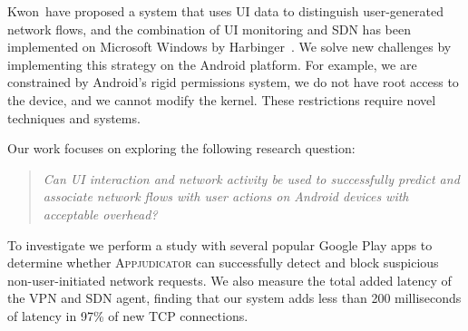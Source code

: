 Kwon~\etal have proposed a system that uses UI data to distinguish
user-generated network flows, and the combination of UI monitoring and SDN has
been implemented on Microsoft Windows by Harbinger~\cite{chuluundorj2019}.  We
solve new challenges by implementing this strategy on the Android platform. For
example, we are constrained by Android's rigid permissions system, we do not
have root access to the device, and we cannot modify the kernel. These
restrictions require novel techniques and systems.

Our work focuses on exploring the following research question: 
\begin{quote}
	\textit{Can UI interaction and network activity be used to successfully
		predict and associate network flows with user actions on Android devices
		with acceptable overhead?}
\end{quote}

To investigate we perform a study with several popular Google Play apps to
determine whether \textsc{Appjudicator} can successfully detect and block
suspicious non-user-initiated network requests. %
We also measure the total added latency of the VPN and SDN agent, finding that
our system adds less than 200 milliseconds of latency in 97\% of new TCP
connections.

\newpage
